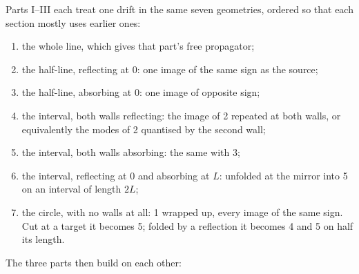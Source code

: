 \documentclass[11pt]{article}
\numberwithin{equation}{section}
\begin{document}
Parts I--III each treat one drift in the same seven geometries, ordered so that each section mostly uses earlier
ones:
\begin{enumerate}
  \item the whole line, which gives that part's free propagator;
  \item the half-line, reflecting at $0$: one image of the same sign as the source;
  \item the half-line, absorbing at $0$: one image of opposite sign;
  \item the interval, both walls reflecting: the image of 2 repeated at both walls, or equivalently the modes
        of 2 quantised by the second wall;
  \item the interval, both walls absorbing: the same with 3;
  \item the interval, reflecting at $0$ and absorbing at $L$: unfolded at the mirror into 5 on an interval of
        length $2L$;
  \item the circle, with no walls at all: 1 wrapped up, every image of the same sign. Cut at a target it
        becomes 5; folded by a reflection it becomes 4 and 5 on half its length.
\end{enumerate}
The three parts then build on each other:
\end{document}
